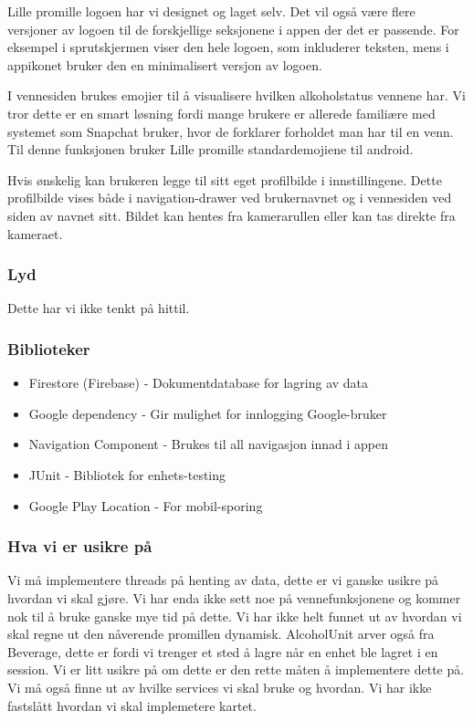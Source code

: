 Lille promille logoen har vi designet og laget selv. Det vil også være flere versjoner av logoen til de forskjellige seksjonene i appen der det er passende. For eksempel i sprutskjermen viser den hele logoen, som inkluderer teksten, mens i appikonet bruker den en minimalisert versjon av logoen.

I vennesiden brukes emojier til å visualisere hvilken alkoholstatus vennene har. Vi tror dette er en smart løsning fordi mange brukere er allerede familiære med systemet som Snapchat bruker, hvor de forklarer forholdet man har til en venn. Til denne funksjonen bruker Lille promille standardemojiene til android.

Hvis ønskelig kan brukeren legge til sitt eget profilbilde i innstillingene. Dette profilbilde vises både i navigation-drawer ved brukernavnet og i vennesiden ved siden av navnet sitt. Bildet kan hentes fra kamerarullen eller kan tas direkte fra kameraet.

\subsubsection{Lyd}
Dette har vi ikke tenkt på hittil.

\subsubsection{Biblioteker}

\begin{itemize}
    \item Firestore (Firebase) - Dokumentdatabase for lagring av data
    \item Google dependency - Gir mulighet for innlogging Google-bruker
    \item Navigation Component - Brukes til all navigasjon innad i appen
    \item JUnit - Bibliotek for enhets-testing
    \item Google Play Location - For mobil-sporing
\end{itemize}

\subsubsection{Hva vi er usikre på}
Vi må implementere threads på henting av data, dette er vi ganske usikre på hvordan vi skal gjøre. Vi har enda ikke sett noe på vennefunksjonene og kommer nok til å bruke ganske mye tid på dette. Vi har ikke helt funnet ut av hvordan vi skal regne ut den nåverende promillen dynamisk. AlcoholUnit arver også fra Beverage, dette er fordi vi trenger et sted å lagre når en enhet ble lagret i en session. Vi er litt usikre på om dette er den rette måten å implementere dette på. Vi må også finne ut av hvilke services vi skal bruke og hvordan. Vi har ikke fastslått hvordan vi skal implemetere kartet.